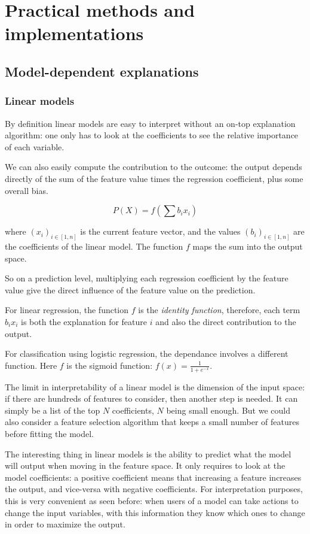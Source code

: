 \documentclass[a4paper,11pt]{kth-mag}
\begin{document}
\chapter{Practical methods and implementations}

\section{Model-dependent explanations}

\subsection{Linear models}

By definition linear models are easy to interpret without an on-top explanation algorithm: one only has to look at the coefficients to see the relative importance of each variable.

We can also easily compute the contribution to the outcome: the output depends directly of the sum of the feature value times the regression 	coefficient, plus some overall bias.

\[
	P(X) = f \left( \sum b_i x_i \right)
\]

where $(x_i)_{i \in [1, n]}$ is the current feature vector, and the values $(b_i)_{i \in [1, n]}$ are the coefficients of the linear model. The function $f$ maps the sum into the output space.

So on a prediction level, multiplying each regression coefficient by the feature value give the direct influence of the feature value on the prediction.

For linear regression, the function $f$ is the \textit{identity function}, therefore, each term $b_i x_i$ is both the explanation for feature $i$ and also the direct contribution to the output.

For classification using logistic regression, the dependance involves a different function. Here $f$ is the sigmoid function: $f(x) = \frac1{1 + e^{-x}}$.

The limit in interpretability of a linear model is the dimension of the input space: if there are hundreds of features to consider, then another step is needed. It can simply be a list of the top $N$ coefficients, $N$ being small enough. But we could also consider a feature selection algorithm that keeps a small number of features before fitting the model.

The interesting thing in linear models is the ability to predict what the model will output when moving in the feature space. It only requires to look at the model coefficients: a positive coefficient means that increasing a feature increases the output, and vice-versa with negative coefficients. For interpretation purposes, this is very convenient as seen before: when users of a model can take actions to change the input variables, with this information they know which ones to change in order to maximize the output.
\end{document}
